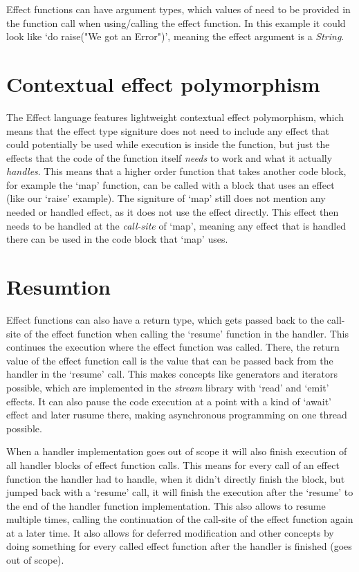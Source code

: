 Effect functions can have argument types, which values of need to be provided in the function call when using/calling the effect function. In this example it could look like `do raise("We got an Error")', meaning the effect argument is a \textit{String}.

\section{Contextual effect polymorphism}

The Effect language features lightweight contextual effect polymorphism, which means that the effect type signiture does not need to include any effect that could potentially be used while execution is inside the function, but just the effects that the code of the function itself \textit{needs} to work and what it actually \textit{handles}. This means that a higher order function that takes another code block, for example the `map' function, can be called with a block that uses an effect (like our `raise' example). The signiture of `map' still does not mention any needed or handled effect, as it does not use the effect directly. This effect then needs to be handled at the \textit{call-site} of `map', meaning any effect that is handled there can be used in the code block that `map' uses.

\section{Resumtion}

Effect functions can also have a return type, which gets passed back to the call-site of the effect function when calling the `resume' function in the handler. This continues the execution where the effect function was called. There, the return value of the effect function call is the value that can be passed back from the handler in the `resume' call. This makes concepts like generators and iterators possible, which are implemented in the \textit{stream} library with `read' and `emit' effects. It can also pause the code execution at a point with a kind of `await' effect and later rusume there, making asynchronous programming on one thread possible.

When a handler implementation goes out of scope it will also finish execution of all handler blocks of effect function calls. This means for every call of an effect function the handler had to handle, when it didn't directly finish the block, but jumped back with a `resume' call, it will finish the execution after the `resume' to the end of the handler function implementation. This also allows to resume multiple times, calling the continuation of the call-site of the effect function again at a later time. It also allows for deferred modification and other concepts by doing something for every called effect function after the handler is finished (goes out of scope).

